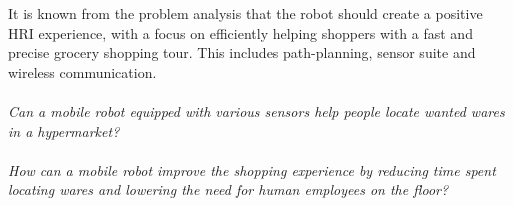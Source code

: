 It is known from the problem analysis that the robot should create a positive HRI experience, with a focus on efficiently helping shoppers with a fast and precise grocery shopping tour. This includes path-planning, sensor suite and wireless communication.\\
\\
\textit{Can a mobile robot equipped with various sensors help people locate wanted wares in a hypermarket?}\\
\\
\textit{How can a mobile robot improve the shopping experience by reducing time spent locating wares and lowering the need for human employees on the floor?}\\